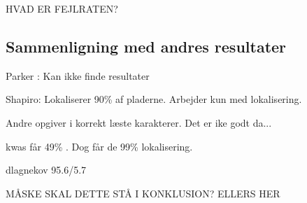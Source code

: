 HVAD ER FEJLRATEN?

\subsection{Sammenligning med andres resultater}
Parker : Kan ikke finde resultater

Shapiro: Lokaliserer 90\% af pladerne. Arbejder kun med lokalisering.

Andre opgiver i korrekt læste karakterer. Det er ike godt da... \cite{nijhuis}

kwas får 49\% . Dog får de 99\% lokalisering.

dlagnekov 95.6/5.7

MÅSKE SKAL DETTE STÅ I KONKLUSION? ELLERS HER
